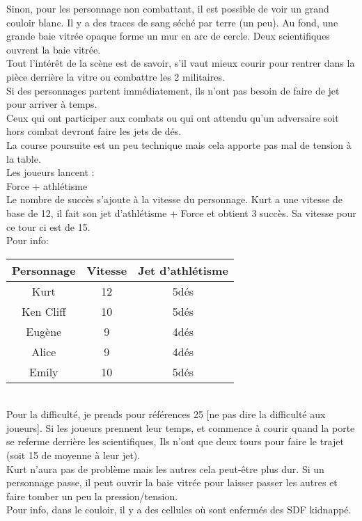 \documentclass[oneside,12pt]{book}
\begin{document}
\begin{flushleft}
\vspace{0.5cm}
Sinon, pour les personnage non combattant, il est possible de voir un grand couloir blanc. Il y a des traces de sang séché par terre (un peu). Au fond, une grande baie vitrée opaque forme un mur en arc de cercle. Deux scientifiques ouvrent la baie vitrée.\\


\vspace{0.5cm}
Tout l'intérêt de la scène est de savoir, s'il vaut mieux courir pour rentrer dans la pièce derrière la vitre ou combattre les 2 militaires.\\


\vspace{0.5cm}
Si des personnages partent immédiatement, ils n'ont pas besoin de faire de jet pour arriver à temps.\\
Ceux qui ont participer aux combats ou qui ont attendu qu'un adversaire soit hors combat devront faire les jets de dés.\\


\vspace{0.5cm}
La course poursuite est un peu technique mais cela apporte pas mal de tension à la table.\\
Les joueurs lancent :\\
Force + athlétisme\\


\vspace{0.5cm}
Le nombre de succès s'ajoute à la vitesse du personnage. Kurt a une vitesse de base de 12, il fait son jet d'athlétisme + Force et obtient 3 succès. Sa vitesse pour ce tour ci est de 15.\\ 
Pour info:\\ 
\begin{tabular}{|c|c|c|}
\hline 
Personnage & Vitesse & Jet d'athlétisme \\ 
\hline 
Kurt & 12 & 5dés \\ 
\hline 
Ken Cliff & 10 & 5dés \\ 
\hline 
Eugène & 9 & 4dés \\ 
\hline 
Alice & 9 & 4dés \\ 
\hline 
Emily & 10 & 5dés \\ 
\hline 
\end{tabular} 
\\
\vspace{0.5cm}
Pour la difficulté, je prends pour références 25 [ne pas dire la difficulté aux joueurs]. Si les joueurs prennent leur temps, et commence à courir quand la porte se referme derrière les scientifiques, Ils n'ont que deux tours pour faire le trajet (soit 15 de moyenne à leur jet).\\
Kurt n'aura pas de problème mais les autres cela peut-être plus dur. Si un personnage passe, il peut ouvrir la baie vitrée pour laisser passer les autres et faire tomber un peu la pression/tension.\\
\vspace{0.5cm}
Pour info, dans le couloir, il y a des cellules où sont enfermés des SDF kidnappé.\\


\end{flushleft}
\end{document}
